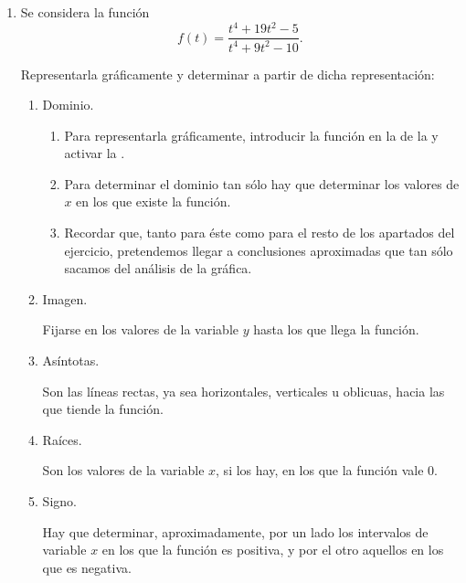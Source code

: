 \begin{enumerate}[leftmargin=*]
\item Se considera la función
      \[
      f(t)=\frac{t^{4} +19t^{2} - 5}{t^{4} +9t^{2} - 10}.
      \]

      Representarla gráficamente y determinar a partir de dicha representación:

      \begin{enumerate}
      \item  Dominio.
            \begin{indication}
            \begin{enumerate}
            \item Para representarla gráficamente, introducir la función en la  de la  y activar la .
            \item Para determinar el dominio tan sólo hay que determinar los valores de $x$ en los que existe la función.
            \item Recordar que, tanto para éste como para el resto de los apartados del ejercicio, pretendemos llegar a conclusiones aproximadas que tan sólo sacamos del análisis de la gráfica.
            \end{enumerate}
            \end{indication}

      \item  Imagen.
            \begin{indication}
            Fijarse en los valores de la variable $y$ hasta los que llega la función.
            \end{indication}

      \item  Asíntotas.
            \begin{indication}
            Son las líneas rectas, ya sea horizontales, verticales u oblicuas, hacia las que tiende la función.
            \end{indication}

      \item  Raíces.
            \begin{indication}
            Son los valores de la variable $x$, si los hay, en los que la función vale 0.
            \end{indication}

      \item Signo.
            \begin{indication}
            Hay que determinar, aproximadamente, por un lado los intervalos de variable $x$ en los que la función es positiva, y por el otro aquellos en
            los que es negativa.
            \end{indication}


\end{enumerate}
\end{enumerate}
